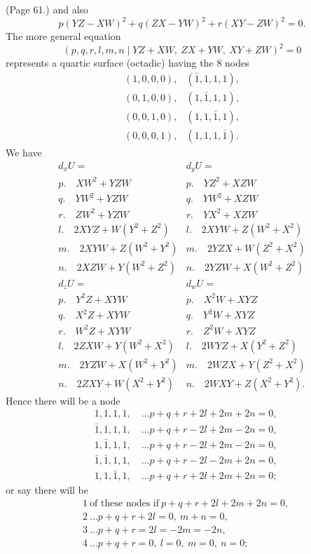 \documentclass[11pt,a4paper]{article}
\begin{document}
\noindent (Page 61.) and also
\[
p(YZ - XW)^2 + q(ZX - YW)^2 + r(XY - ZW)^2 = 0.
\]
The more general equation
\[
(p, q, r, l, m, n \mid YZ + XW,\ ZX + YW,\ XY + ZW)^2 = 0
\]
represents a quartic surface (octadic) having the $8$ nodes
\[
\begin{array}{ll}
(1, 0, 0, 0), & (\bar{1}, 1, 1, 1), \\
(0, 1, 0, 0), & (1, \bar{1}, 1, 1), \\
(0, 0, 1, 0), & (1, 1, \bar{1}, 1), \\
(0, 0, 0, 1), & (1, 1, 1, \bar{1}).
\end{array}
\]
We have
\[
\begin{array}{l|l}
d_x U = & d_y U = \\ \hline
p.\quad XW^2 + YZW & p.\quad YZ^2 + XZW \\
q.\quad YW^2 + YZW & q.\quad YW^2 + XZW \\
r.\quad ZW^2 + YZW & r.\quad YX^2 + XZW \\
l.\quad 2XYZ + W(Y^2 + Z^2) & l.\quad 2XYW + Z(W^2 + X^2) \\
m.\quad 2XYW + Z(W^2 + Y^2) & m.\quad 2YZX + W(Z^2 + X^2) \\
n.\quad 2XZW + Y(W^2 + Z^2) & n.\quad 2YZW + X(W^2 + Z^2)
\end{array}
\]
\[
\begin{array}{l|l}
d_z U = & d_w U = \\ \hline
p.\quad Y^2 Z + XYW & p.\quad X^2 W + XYZ \\
q.\quad X^2 Z + XYW & q.\quad Y^2 W + XYZ \\
r.\quad W^2 Z + XYW & r.\quad Z^2 W + XYZ \\
l.\quad 2ZXW + Y(W^2 + X^2) & l.\quad 2WYZ + X(Y^2 + Z^2) \\
m.\quad 2YZW + X(W^2 + Y^2) & m.\quad 2WZX + Y(Z^2 + X^2) \\
n.\quad 2ZXY + W(X^2 + Y^2) & n.\quad 2WXY + Z(X^2 + Y^2).
\end{array}
\]
Hence there will be a node
\begin{align*}
&1, 1, 1, 1,\quad \ldots p + q + r + 2l + 2m + 2n = 0, \\
&\bar{1}, 1, 1, 1,\quad \ldots p + q + r - 2l + 2m - 2n = 0, \\
&1, \bar{1}, 1, 1,\quad \ldots p + q + r - 2l + 2m - 2n = 0, \\
&\bar{1}, \bar{1}, 1, 1,\quad \ldots p + q + r - 2l - 2m + 2n = 0, \\
&1, 1, \bar{1}, 1,\quad \ldots p + q + r + 2l + 2m + 2n = 0;
\end{align*}
or say there will be
\begin{align*}
&1\ \text{of these nodes if}\ p + q + r + 2l + 2m + 2n = 0, \\
&2\ \ldots p + q + r + 2l = 0,\ m + n = 0, \\
&3\ \ldots p + q + r = 2l = -2m = -2n, \\
&4\ \ldots p + q + r = 0,\ l = 0,\ m = 0,\ n = 0;
\end{align*}
\end{document}
